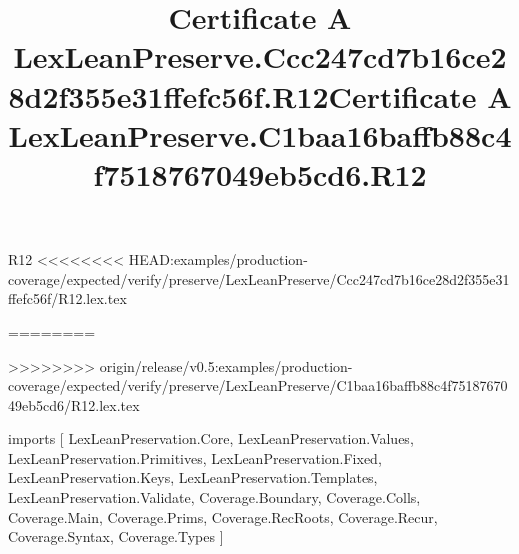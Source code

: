 \begin{lexlean}{R12}
<<<<<<<< HEAD:examples/production-coverage/expected/verify/preserve/LexLeanPreserve/Ccc247cd7b16ce28d2f355e31ffefc56f/R12.lex.tex
\title{Certificate A LexLeanPreserve.Ccc247cd7b16ce28d2f355e31ffefc56f.R12}
========
\title{Certificate A LexLeanPreserve.C1baa16baffb88c4f7518767049eb5cd6.R12}
>>>>>>>> origin/release/v0.5:examples/production-coverage/expected/verify/preserve/LexLeanPreserve/C1baa16baffb88c4f7518767049eb5cd6/R12.lex.tex
\begin{coremodule}
imports [
  LexLeanPreservation.Core,
  LexLeanPreservation.Values,
  LexLeanPreservation.Primitives,
  LexLeanPreservation.Fixed,
  LexLeanPreservation.Keys,
  LexLeanPreservation.Templates,
  LexLeanPreservation.Validate,
  Coverage.Boundary,
  Coverage.Colls,
  Coverage.Main,
  Coverage.Prims,
  Coverage.RecRoots,
  Coverage.Recur,
  Coverage.Syntax,
  Coverage.Types
]


\end{coremodule}
\end{lexlean}
